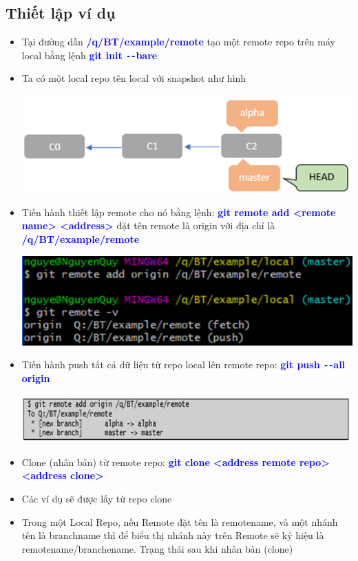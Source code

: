 \documentclass[12pt,a4paper]{report}
\begin{document}
\subsection{Thiết lập ví dụ}
\begin{itemize}
\item Tại đường dẫn \textcolor{blue}{\bf /q/BT/example/remote} tạo một remote repo trên máy local bằng lệnh \textcolor{blue}{\bf git init \texttt{-{}-}bare}
\item Ta có một local repo tên local với snapshot như hình

	\includegraphics[width=0.8\linewidth]{screenshot065}
	
	\label{fig:screenshot065}

\item Tiến hành thiết lập remote cho nó bằng lệnh: \textcolor{blue}{\bf git remote add <remote  name> <address>} đặt tên remote là origin với địa chỉ là \textcolor{blue}{\bf /q/BT/example/remote}

	\includegraphics[width=0.8\linewidth]{screenshot066}

	\label{fig:screenshot066}
	
\item Tiến hành push tất cả dữ liệu từ repo local lên remote repo: \textcolor{blue}{\bf git push \texttt{-{}-}all origin}

	
	\includegraphics[width=0.8\linewidth]{screenshot07}

	\label{fig:screenshot07}

\item Clone (nhân bản) từ remote repo: \textcolor{blue}{\bf git clone <address remote repo> <address clone>}
\item Các ví dụ sẽ được lấy từ repo clone
\item Trong một Local Repo, nếu Remote đặt tên là remotename, và một nhánh tên là branchname thì để biểu thị nhánh này trên Remote sẽ ký hiệu là remotename/branchename. Trạng thái sau khi nhân bản (clone)
\end{itemize}
\end{document}
